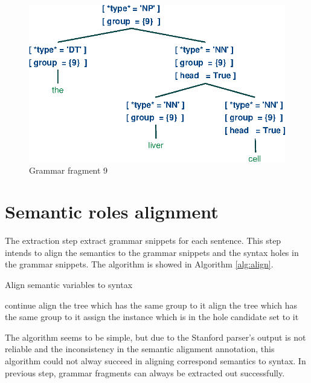 \documentclass[a4paper]{article}
\begin{document}
\begin{figure}[h]
    \begin{center}
        \includegraphics[scale=0.5]{9.eps}
    \end{center}
    \caption{Grammar fragment 9}
\end{figure}
\section{Semantic roles alignment}
The extraction step extract grammar snippets for each sentence. This step intends to align the semantics to the grammar snippets and the syntax holes in the grammar snippets. The algorithm is showed in Algorithm \ref{alg:align}.

\begin{algorithm}
    \caption{Align semantic variables to syntax}
    \label{alg:align}
    \begin{algorithmic}[1]
            \STATE continue
        \ELSE
            \STATE align the tree which has the same group to it
        \ENDIF
        \ENDFOR
        \STATE align the tree which has the same group to it
                \STATE assign the instance which is in the hole candidate set to it
            \ENDFOR
        \ENDFOR
    \end{algorithmic}
\end{algorithm}

The algorithm seems to be simple, but due to the Stanford parser's output is not reliable and the inconsistency in the semantic alignment annotation, this algorithm could not alway succeed in aligning correspond semantics to syntax. In previous step, grammar fragments can always be extracted out successfully.
\end{document}
